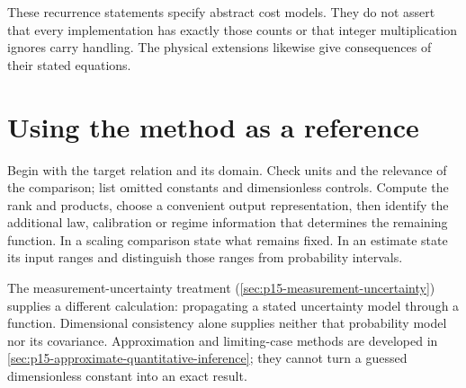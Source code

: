 These recurrence statements specify abstract cost models. They do not assert
that every implementation has exactly those counts or that integer
multiplication ignores carry handling. The physical extensions likewise
give consequences of their stated equations.

\section{Using the method as a reference}
\label{sec:p15-dimensional-reference}

Begin with the target relation and its domain. Check units and the relevance
of the comparison; list omitted constants and dimensionless controls.
Compute the rank and products, choose a convenient output representation,
then identify the additional law, calibration or regime information that
determines the remaining function. In a scaling comparison state what remains
fixed. In an estimate state its input ranges and distinguish those ranges
from probability intervals.

The measurement-uncertainty treatment
(\cref{sec:p15-measurement-uncertainty}) supplies a different calculation:
propagating a stated uncertainty model through a function. Dimensional
consistency alone supplies neither that probability model nor its covariance.
Approximation and limiting-case methods are developed in
\cref{sec:p15-approximate-quantitative-inference}; they cannot turn a guessed
dimensionless constant into an exact result.
